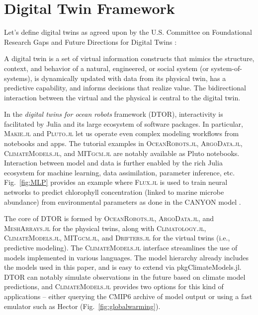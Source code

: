 \documentclass{juliacon}[12pt]
\newcommand{\pkg}[1]{{\small \textsc{#1}}}
\begin{document}
\section{Digital Twin Framework} \label{sec:DT}

Let's define digital twins as agreed upon by the U.S. Committee on Foundational Research Gaps and Future Directions for Digital Twins \cite{DT2024} : 

\begin{defi}
A digital twin is a set of virtual information constructs that mimics the structure, context, and behavior of a natural, engineered, or social system (or system-of-systems), is dynamically updated with data from its physical twin, has a predictive capability, and informs decisions that realize value. The bidirectional interaction between the virtual and the physical is central to the digital twin.
\end{defi}

In the {\it digital twins for ocean robots} framework (DTOR), interactivity is facilitated by Julia and its large ecosystem of software packages. In particular, \pkg{Makie.jl} \cite{Makie} and \pkg{Pluto.jl} \cite{Pluto} let us operate even complex modeling workflows from notebooks and apps. The tutorial examples in \pkg{OceanRobots.jl}, \pkg{ArgoData.jl}, \pkg{ClimateModels.jl}, and \pkg{MITgcm.jl} \cite{Forget2024b} are notably available as Pluto notebooks. Interaction between model and data is further enabled by the rich Julia ecosystem for machine learning, data assimilation, parameter inference, etc. Fig.~\ref{fig:MLP} provides an example where \pkg{Flux.jl} \cite{Innes2018} is used to train neural networks to predict chlorophyll concentration (linked to marine microbe abundance) from environmental parameters as done in the CANYON model \cite{Sauzede2017,Bittig2018}.

The core of DTOR is formed by \pkg{OceanRobots.jl}, \pkg{ArgoData.jl}, and \pkg{MeshArrays.jl} for the physical twins, along with \pkg{Climatology.jl}, \pkg{ClimateModels.jl}, \pkg{MITgcm.jl}, and \pkg{Drifters.jl} for the virtual twins (i.e., predictive modeling). The \pkg{ClimateModels.jl} interface streamlines the use of models implemented in various languages. The model hierarchy already includes the models used in this paper, and is easy to extend via pkg{ClimateModels.jl}. DTOR can notably simulate observations in the future based on climate model predictions, and \pkg{ClimateModels.jl} provides two options for this kind of applications -- either querying the CMIP6 archive of model output \cite{CMIP6} or using a fast emulator such as Hector \cite{Hector2015} (Fig.~\ref{fig:globalwarming}). 
\end{document}
